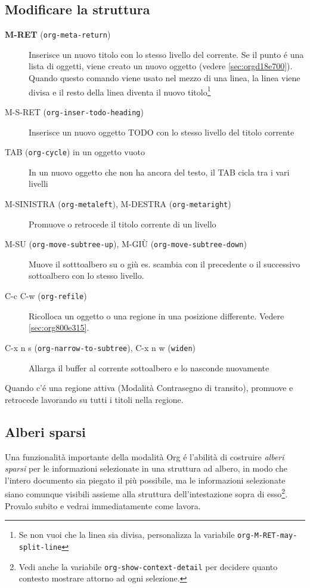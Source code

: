 \documentclass[11pt]{article}
\begin{document}
\subsection{Modificare la struttura}
\label{sec:org0b8d069}
\begin{description}
\item[{\textbf{M-RET} (\texttt{org-meta-return})}] Inserisce un nuovo titolo con lo stesso livello del corrente. Se il punto
é una lista di oggetti, viene creato un nuovo oggetto (vedere \ref{sec:orgd18e700}). Quando questo comando viene usato nel mezzo di una linea, la
linea viene divisa e il resto della linea diventa il nuovo titolo\footnote{Se non vuoi che la linea sia divisa, personalizza la variabile
\texttt{org-M-RET-may-split-line}}

\item[{M-S-RET (\texttt{org-inser-todo-heading})}] Inserisce un nuovo oggetto TODO con lo stesso livello del titolo corrente

\item[{TAB (\texttt{org-cycle}) in un oggetto vuoto}] In un nuovo oggetto che non ha ancora del testo, il TAB cicla tra i vari
livelli

\item[{M-SINISTRA (\texttt{org-metaleft}), M-DESTRA (\texttt{org-metaright})}] Promuove o retrocede il titolo corrente di un livello

\item[{M-SU (\texttt{org-move-subtree-up}), M-GIÙ (\texttt{org-move-subtree-down})}] Muove il sotttoalbero su o giù es. scambia con il precedente o il
successivo sottoalbero con lo stesso livello.

\item[{C-c C-w (\texttt{org-refile})}] Ricolloca un oggetto o una regione in una posizione differente. Vedere
\ref{sec:org800e315}.

\item[{C-x n s (\texttt{org-narrow-to-subtree}), C-x n w (\texttt{widen})}] Allarga il buffer al corrente sottoalbero e lo nasconde nuovamente
\end{description}

Quando c'é una regione attiva (Modalità Contrasegno di transito), promuove
e retrocede lavorando su tutti i titoli nella regione.

\subsection{Alberi sparsi}
\label{sec:org7974999}
Una funzionalità importante della modalità Org é l'abilità di costruire
\emph{alberi sparsi} per le informazioni selezionate in una struttura ad albero,
in modo che l'intero documento sia piegato il più possibile, ma le
informazioni selezionate siano comunque visibili assieme alla struttura
dell'intestazione sopra di esso\footnote{Vedi anche la variabile \texttt{org-show-context-detail} per decidere
quanto contesto mostrare attorno ad ogni selezione.}. Provalo subito e vedrai immediatamente
come lavora.
\end{document}
